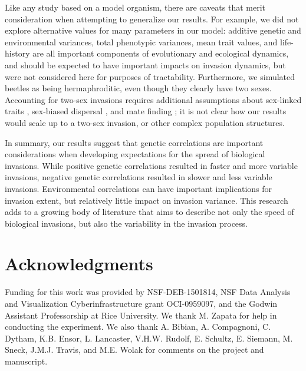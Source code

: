 Like any study based on a model organism, there are caveats that merit consideration when attempting to generalize our results. For example, we did not explore alternative values for many parameters in our model: additive genetic and environmental variances, total phenotypic variances, mean trait values, and life-history are all important components of evolutionary and ecological dynamics, and should be expected to have important impacts on invasion dynamics, but were not considered here for purposes of tractability.  Furthermore, we simulated beetles as being hermaphroditic, even though they clearly have two sexes. Accounting for two-sex invasions requires additional assumptions about sex-linked traits \citep{guntrip_effect_1997}, sex-biased dispersal \citep{miller_sex-biased_2011,miller_confronting_2011,miller_sex_2013}, and mate finding \citep{shaw_mate_2014}; it is not clear how our results would scale up to a two-sex invasion, or other complex population structures.

In summary, our results suggest that genetic correlations are important considerations when developing expectations for the spread of biological invasions. While positive genetic correlations resulted in faster and more variable invasions, negative genetic correlations resulted in slower and less variable invasions. Environmental correlations can have important implications for invasion extent, but relatively little impact on invasion variance. This research adds to a growing body of literature that aims to describe not only the speed of biological invasions, but also the variability in the invasion process.

\section{Acknowledgments}
Funding for this work was provided by NSF-DEB-1501814, NSF Data Analysis and Visualization Cyberinfrastructure grant OCI-0959097, and the Godwin Assistant Professorship at Rice University. We thank M. Zapata for help in conducting the experiment. We also thank A. Bibian, A. Compagnoni, C. Dytham, K.B. Ensor, L. Lancaster, V.H.W. Rudolf, E. Schultz, E. Siemann, M. Sneck, J.M.J. Travis, and M.E. Wolak for comments on the project and manuscript.
